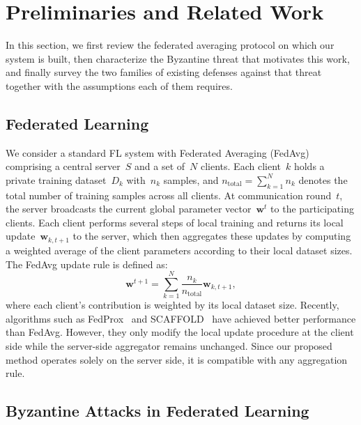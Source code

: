 \documentclass[journal]{IEEEtran}
\begin{document}
\section{Preliminaries and Related Work}
\label{sec:preliminaries}

In this section, we first review the federated averaging protocol on which our system is
built, then characterize the Byzantine threat that motivates this work, and finally survey the
two families of existing defenses against that threat together with the assumptions each of
them requires.

\subsection{Federated Learning}

We consider a standard FL system with Federated Averaging (FedAvg)~\cite{mcmahan2017communication} comprising a central server~$S$ and a set of~$N$ clients. Each client~$k$ holds a private training dataset~$D_k$ with~$n_k$ samples, and $n_{\text{total}} = \sum_{k=1}^{N} n_k$ denotes the total number of training samples across all clients. At communication round~$t$, the server broadcasts the current global parameter vector~$\mathbf{w}^t$ to the participating clients. Each client performs several steps of local training and returns its local update~$\mathbf{w}_{k,t+1}$ to the server, which then aggregates these updates by computing a weighted average of the client parameters according to their local dataset sizes. The FedAvg update rule is defined as:
\begin{equation}
\mathbf{w}^{t+1} = \sum_{k=1}^{N} \frac{n_k}{n_{\text{total}}} \mathbf{w}_{k,t+1},
\label{eq:fedavg}
\end{equation}
where each client's contribution is weighted by its local dataset size. Recently, algorithms such as FedProx~\cite{li2020federated} and SCAFFOLD~\cite{karimireddy2021scaffold} have achieved better performance than FedAvg. However, they only modify the local update procedure at the client side while the server-side aggregator remains unchanged. Since our proposed method operates solely on the server side, it is compatible with any aggregation rule.

\subsection{Byzantine Attacks in Federated Learning}
\end{document}
